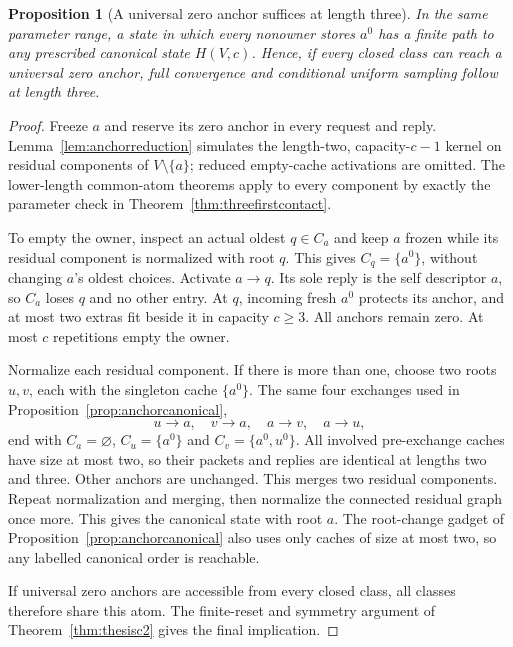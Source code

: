 \documentclass[11pt]{article}
\newtheorem{proposition}[theorem]{Proposition}
\begin{document}
\begin{proposition}[A universal zero anchor suffices at length three]
\label{prop:threezeroanchor}
In the same parameter range, a state in which every
nonowner stores $a^0$ has a finite path to any prescribed
canonical state $H(V,c)$. Hence, if every closed class
can reach a universal zero anchor, full convergence and
conditional uniform sampling follow at length three.
\end{proposition}
\begin{proof}
Freeze $a$ and reserve its zero anchor in every request
and reply. Lemma~\ref{lem:anchorreduction} simulates
the length-two, capacity-$c-1$ kernel on residual
components of $V\setminus\{a\}$; reduced empty-cache
activations are omitted. The lower-length common-atom
theorems apply to every component by exactly the
parameter check in Theorem~\ref{thm:threefirstcontact}.

To empty the owner, inspect an actual oldest $q\in C_a$
and keep $a$ frozen while its residual component is
normalized with root $q$. This gives $C_q=\{a^0\}$,
without changing $a$'s oldest choices. Activate $a\to q$.
Its sole reply is the self descriptor $a$, so $C_a$
loses $q$ and no other entry. At $q$, incoming fresh
$a^0$ protects its anchor, and at most two extras fit
beside it in capacity $c\ge3$. All anchors remain zero.
At most $c$ repetitions empty the owner.

Normalize each residual component. If there is more
than one, choose two roots $u,v$, each with the singleton
cache $\{a^0\}$. The same four exchanges used in
Proposition~\ref{prop:anchorcanonical},
\[
 u\to a,\quad v\to a,\quad a\to v,\quad a\to u,
\]
end with $C_a=\varnothing$, $C_u=\{a^0\}$ and
$C_v=\{a^0,u^0\}$. All involved pre-exchange caches
have size at most two, so their packets and replies
are identical at lengths two and three. Other anchors
are unchanged. This merges two residual components.
Repeat normalization and merging, then normalize the
connected residual graph once more. This gives the
canonical state with root $a$. The root-change gadget
of Proposition~\ref{prop:anchorcanonical} also uses
only caches of size at most two, so any labelled
canonical order is reachable.

If universal zero anchors are accessible from every
closed class, all classes therefore share this atom.
The finite-reset and symmetry argument of
Theorem~\ref{thm:thesisc2} gives the final implication.
\end{proof}
\end{document}
